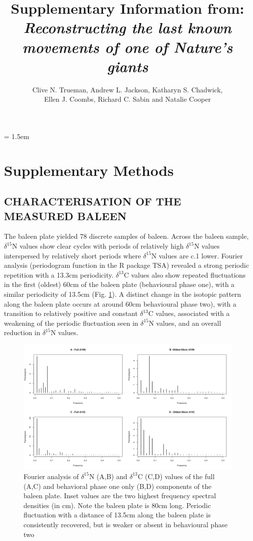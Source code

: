 \documentclass[a4paper,12pt]{article}
\title{Supplementary Information from:\\
\textit{Reconstructing the last known movements of one of Nature's giants}}
\author{Clive N. Trueman, Andrew L. Jackson, Katharyn S. Chadwick,\\ 
Ellen J. Coombs, Richard C. Sabin and Natalie Cooper}
\date{}
\begin{document}

\maketitle

\parindent = 1.5em
\addtolength{\parskip}{.3em}


\section*{Supplementary Methods}
 
\subsection*{CHARACTERISATION OF THE MEASURED BALEEN}
The baleen plate yielded 78 discrete samples of baleen. 
Across the baleen sample, $\delta^{15}$N values show clear cycles with periods of relatively high $\delta^{15}$N values interspersed by relatively short periods where $\delta^{15}$N values are c.1\text{\textperthousand} lower. 
Fourier analysis (periodogram function in the R package TSA\cite{Chan:2012aa}) revealed a strong periodic repetition with a 13.3cm periodicity. 
$\delta^{13}$C values also show repeated fluctuations in the first (oldest) 60cm of the baleen plate (behavioural phase one), with a similar periodicity of 13.5cm (Fig. \ref{figs1}). 
A distinct change in the isotopic pattern along the baleen plate occurs at around 60cm behavioural phase two), with a transition to relatively positive and constant $\delta^{13}$C values, associated with a weakening of the periodic fluctuation seen in $\delta^{15}$N values, and an overall reduction in $\delta^{15}$N values.

\begin{figure}[!htbp]
  \centering
  \includegraphics[width = \linewidth]{figures/Figure-S1-periodograms.png}
  \caption{Fourier analysis of $\delta^{15}$N (A,B) and $\delta^{13}$C (C,D) values of the full (A,C) and behavioral phase one only (B,D) components of the baleen plate. Inset values are the two highest frequency spectral densities (in cm). Note the baleen plate is 80cm long. Periodic fluctuation with a distance of 13.5cm along the baleen plate is consistently recovered, but is weaker or absent in behavioural phase two} 
  \label{figs1}
\end{figure}
 
\end{document}
